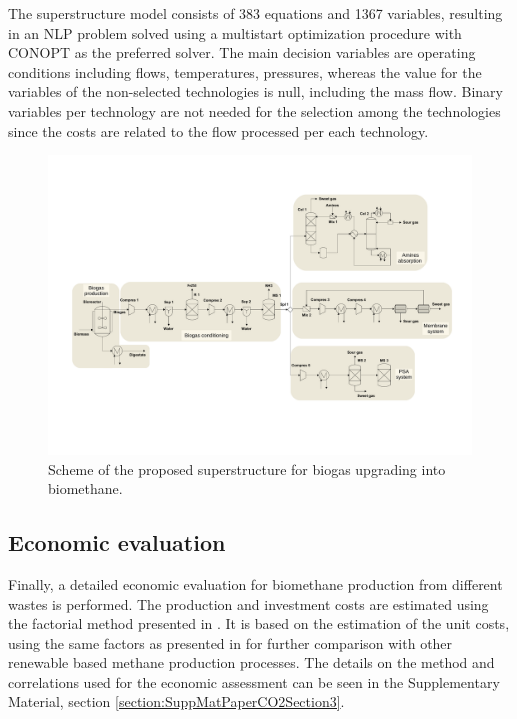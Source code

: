 \begin{refsection}[referencesCh7]
The superstructure model consists of 383 equations and 1367 variables, resulting in an NLP problem solved using a multistart optimization procedure with CONOPT as the preferred solver. The main decision variables are operating conditions including flows, temperatures, pressures, whereas the value for the variables of the non-selected technologies is null, including the mass flow. Binary
variables per technology are not needed for the selection among the technologies since the costs are related to the flow processed per each technology.

\begin{figure}[h]
	\centering
	\includegraphics[width=1\linewidth, trim={3cm 7cm 3cm 5cm},clip]{gfx/Chapter7/Figure2.pdf} 
	\caption{Scheme of the proposed superstructure for biogas upgrading into biomethane.}
	\label{fig:Ch7Fig2}
\end{figure}

\subsection{Economic evaluation}\label{section:Ch7Economicevaluation}
Finally, a detailed economic evaluation for biomethane production from different wastes is performed. The production and investment costs are estimated using the factorial method presented in \citet{towler2009chemical}. It is based on the estimation of the unit costs, using the same factors as presented in \citet{davis2014optimala, davis2014optimalb} for further comparison with other renewable based methane production processes. The details on the method and correlations used for the economic assessment can be seen in the Supplementary Material, section \ref{section:SuppMatPaperCO2Section3}.



\end{refsection}
